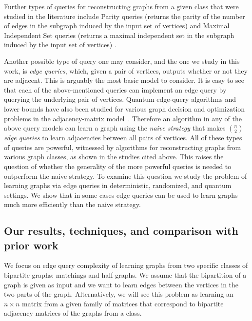 \documentclass[11pt]{article}
\begin{document}
\noindent
Further types of queries for reconstructing graphs from a given class that were studied in the literature include 
Parity queries (returns the parity of the number of edges in the subgraph induced by the input set of vertices) \cite{MS22} and
Maximal Independent Set queries (returns a maximal independent set in the subgraph induced by the input set of vertices) \cite{KOT24}.

Another possible type of query one may consider, and the one we study in this work, is \emph{edge queries}, which, given a pair of vertices, outputs whether or not they are adjacent. This is arguably the most basic model to consider. It is easy to see that each of the above-mentioned queries can implement an edge query by querying the underlying pair of vertices.
Quantum edge-query algorithms and lower bounds have also been studied for various graph decision and optimization problems in the adjacency-matrix model~\cite{BDFLS04,DHHM06}.
%
Therefore an algorithm in any of the above query models can learn a graph using the \emph{naive strategy} that makes $\binom{n}{2}$ \emph{edge queries} to learn adjacencies between all pairs of vertices.
All of these types of queries are powerful, witnessed by algorithms for reconstructing graphs from various graph classes, as shown in the studies cited above.
%
This raises the question of whether the generality of the more powerful queries is needed to outperform the naive strategy.
%
To examine this question we study the problem of learning graphs via edge queries in deterministic, randomized, and quantum settings.
We show that in some cases edge queries can be used to learn graphs much more efficiently than the naive strategy.

\subsection{Our results, techniques, and comparison with prior work}

We focus on edge query complexity of learning graphs from two specific classes of bipartite graphs: matchings and half graphs. We assume that the bipartition of a graph is given as input and we want to learn edges between the vertices in the two parts of the graph. Alternatively, we will see this problem as learning an $n \times n$ matrix from a given family of matrices that correspond to bipartite adjacency matrices of the graphs from a class.
\end{document}
